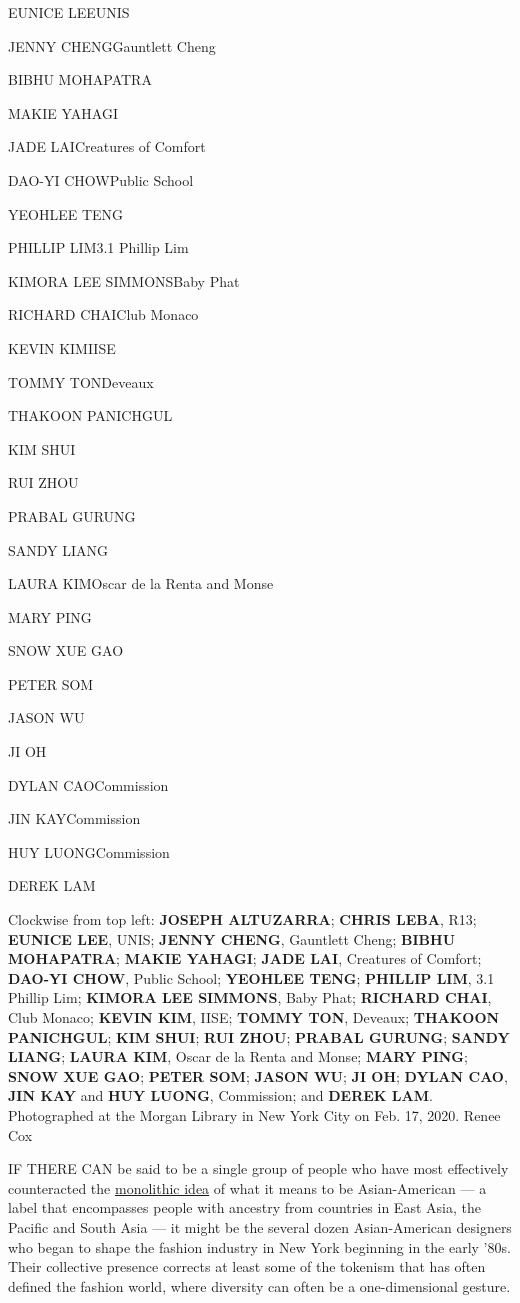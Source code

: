 EUNICE LEEUNIS

JENNY CHENGGauntlett Cheng

BIBHU MOHAPATRA

MAKIE YAHAGI

JADE LAICreatures of Comfort

DAO-YI CHOWPublic School

YEOHLEE TENG

PHILLIP LIM3.1 Phillip Lim

KIMORA LEE SIMMONSBaby Phat

RICHARD CHAIClub Monaco

KEVIN KIMIISE

TOMMY TONDeveaux

THAKOON PANICHGUL

KIM SHUI

RUI ZHOU

PRABAL GURUNG

SANDY LIANG

LAURA KIMOscar de la Renta and Monse

MARY PING

SNOW XUE GAO

PETER SOM

JASON WU

JI OH

DYLAN CAOCommission

JIN KAYCommission

HUY LUONGCommission

DEREK LAM

Clockwise from top left: \textbf{JOSEPH ALTUZARRA}; \textbf{CHRIS LEBA},
R13; \textbf{EUNICE LEE}, UNIS; \textbf{JENNY CHENG}, Gauntlett Cheng;
\textbf{BIBHU MOHAPATRA}; \textbf{MAKIE YAHAGI}; \textbf{JADE LAI},
Creatures of Comfort; \textbf{DAO-YI CHOW}, Public School;
\textbf{YEOHLEE TENG}; \textbf{PHILLIP LIM}, 3.1 Phillip Lim;
\textbf{KIMORA LEE SIMMONS}, Baby Phat; \textbf{RICHARD CHAI}, Club
Monaco; \textbf{KEVIN KIM}, IISE; \textbf{TOMMY TON}, Deveaux;
\textbf{THAKOON PANICHGUL}; \textbf{KIM SHUI}; \textbf{RUI ZHOU};
\textbf{PRABAL GURUNG}; \textbf{SANDY LIANG}; \textbf{LAURA KIM}, Oscar
de la Renta and Monse; \textbf{MARY PING}; \textbf{SNOW XUE GAO};
\textbf{PETER SOM}; \textbf{JASON WU}; \textbf{JI OH}; \textbf{DYLAN
CAO}, \textbf{JIN KAY} and \textbf{HUY LUONG}, Commission; and
\textbf{DEREK LAM}. Photographed at the Morgan Library in New York City
on Feb. 17, 2020. Renee Cox

IF THERE CAN be said to be a single group of people who have most
effectively counteracted the
\href{https://www.nytimes.com/2019/08/26/t-magazine/asian-american-comedians.html}{monolithic
idea} of what it means to be Asian-American --- a label that encompasses
people with ancestry from countries in East Asia, the Pacific and South
Asia --- it might be the several dozen Asian-American designers who
began to shape the fashion industry in New York beginning in the early
'80s. Their collective presence corrects at least some of the tokenism
that has often defined the fashion world, where diversity can often be a
one-dimensional gesture.

